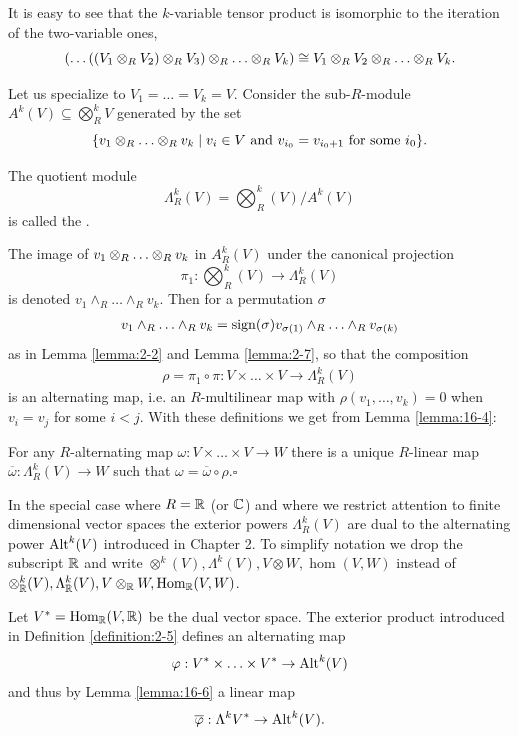 It is easy to see that the $k$-variable tensor product is isomorphic to the iteration
of the two-variable ones,
\[
  (\ldots((V_1\otr V_2)\otr V_3)\otr\ldots\otr V_k) \simee V_1\otr V_2\otr\ldots\otr V_k.
\]

Let us specialize to $V_1=\ldots=V_k=V$. Consider the sub-$R$-module $A^k(V)\subseteq \bigotimes_R^k V$
generated by the set 
\[
  \{v_1\otr\ldots\otr v_k\mid v_i\in V \text{ and } v_{i_0}=v_{i_0+1} \text{ for some } i_0\}.
\]

\begin{definition}\label{definition:16-5}
  The quotient module 
  \[
    \Lambda_R^k(V) = \bigotimes_R^k (V) / A^k(V)
  \]
  is called the .
\end{definition}

The image of $v_1\otr\ldots\otr v_k$ in $A_R^k(V)$ under the canonical projection  
\[
  \pi_1: \bigotimes_R^k (V) \to \Lambda_R^k (V)
\]
is denoted $v_1\wedge_R\ldots\wedge_R v_k$. Then for a permutation $\sigma$
\begin{align}\label{eq:16-5}
  v_1\wedge_R\ldots\wedge_R v_k
  = \sign(\sigma) v_{\sigma(1)}\wedge_R\ldots\wedge_R v_{\sigma(k)}
\end{align}
as in Lemma \ref{lemma:2-2} and Lemma \ref{lemma:2-7}, so that the composition 
\begin{align}\label{eq:16-6}
  \rho = \pi_1\circ\pi:V\times\ldots\times V \to \Lambda_R^k(V)
\end{align}
is an alternating map, i.e. an $R$-multilinear map with $\rho(v_1,\ldots,v_k)=0$ when 
$v_i=v_j$ for some $i<j$. With these definitions we get from Lemma \ref{lemma:16-4}:

\begin{lemma}\label{lemma:16-6}
  For any $R$-alternating map $\omega: V \times\ldots \times V\to W$ there is a unique $R$-linear 
  map $\overline{\omega}:\Lambda_R^k(V)\to W$ such that $\omega = \overline{\omega}\circ\rho$.\hfill $\square$
\end{lemma}

In the special case where $R = \RR$ (or $\CC$) and where we restrict attention to finite 
dimensional vector spaces the exterior powers $\Lambda_R^k(V)$ are dual to the alternating
power $\alt^k(V)$ introduced in Chapter 2. To simplify notation we drop the subscript $\RR$ and write
$\otimes^k(V), \Lambda^k(V), V\otimes W, \hom(V, W)$ instead of $\otimes_\RR^k(V), \Lambda_\RR^k(V), 
V\otr[\RR] W, \hom_\RR(V, W)$.

Let $V^*=\hom_\RR(V, \RR)$ be the dual vector space. The exterior product introduced in Definition \ref{definition:2-5}
defines an alternating map 
\[
  \varphi:V^*\times\ldots\times V^*\to \alt^k(V)
\]
and thus by Lemma \ref{lemma:16-6} a linear map 
\[
  \overline{\varphi}:\Lambda^k V^*\to \alt^k(V).
\]

